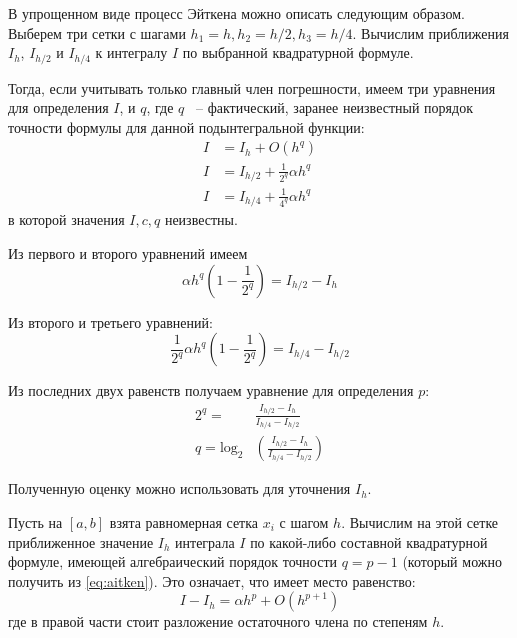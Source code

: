 \documentclass[a4paper, fontsize=14pt]{article}
\begin{document}
В упрощенном виде процесс Эйткена можно описать следующим образом. 
Выберем три сетки с шагами $h_1 = h, h_2 = h/2, h_3 = h/4$. Вычислим
приближения $I_h$, $I_{h/2}$ и $I_{h/4}$ к интегралу $I$ по выбранной квадратурной
формуле.

Тогда, если учитывать только главный член погрешности, имеем три уравнения для определения $I$, и $q$, где $q$ ~-- фактический, заранее неизвестный порядок точности формулы для данной подынтегральной функции:
\begin{equation*}
    \begin{aligned}
        I &= I_h + O(h^q) \\
        I &= I_{h/2} + \frac{1}{2^q} \alpha h^q \\
        I &= I_{h/4} + \frac{1}{4^q} \alpha h^q
    \end{aligned}
\end{equation*}
в которой значения $I, c, q$ неизвестны. 

Из первого и второго уравнений имеем
\begin{equation*}
    \alpha h^q \left (1 - \frac{1}{2^q}\right) = I_{h/2} - I_h
\end{equation*}

Из второго и третьего уравнений:
\begin{equation*}
    \frac{1}{2^q} \alpha h^q \left (1 - \frac{1}{2^q}\right) =  I_{h/4} - I_{h/2}
\end{equation*}

Из последних двух равенств получаем уравнение для определения $p$:
\begin{equation}
    \label{eq:aitken}
    \begin{aligned}
        2^q = &\frac{I_{h/2} - I_h}{I_{h/4} - I_{h/2}} \\
        q = \operatorname{log_2} &\left( \frac{I_{h/2} - I_h}{I_{h/4} - I_{h/2}} \right)
    \end{aligned}
\end{equation}

Полученную оценку можно использовать для уточнения $I_h$. 

Пусть на $[a, b]$ взята равномерная сетка ${x_i}$ с шагом $h$. Вычислим на
этой сетке приближенное значение $I_h$ интеграла $I$ по какой-либо составной
квадратурной формуле, имеющей алгебраический порядок точности $q = p-1$ (который можно получить из \eqref{eq:aitken}).
Это означает, что имеет место равенство:
\begin{equation}
    \label{eq:runge_1}
    I - I_h = \alpha h^p + O(h^{p+1})
\end{equation}
где в правой части стоит разложение остаточного члена по степеням $h$.
\end{document}
